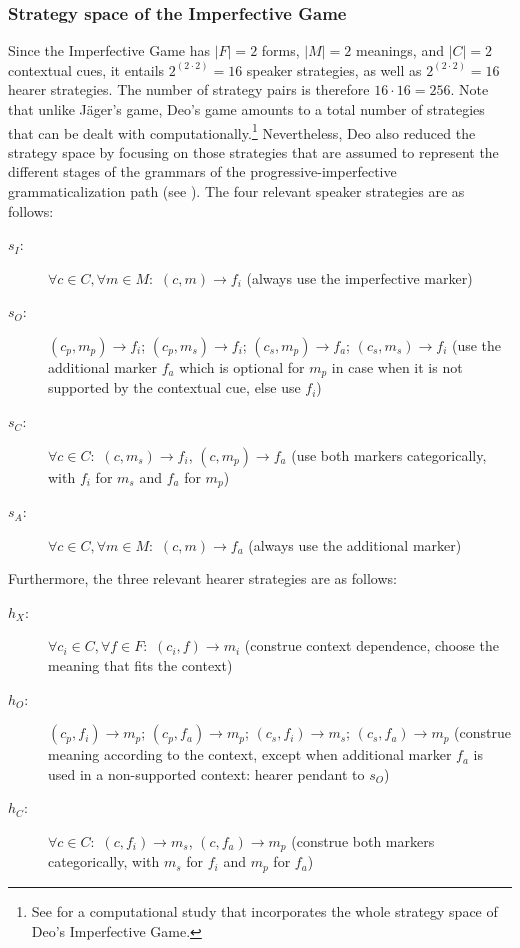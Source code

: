 \documentclass[output=paper,hidelinks]{langscibook}
\begin{document}
\subsubsection{Strategy space of the Imperfective Game}

Since the Imperfective Game has $|F|=2$ forms, $|M| = 2$ meanings, and $|C| = 2$ contextual cues, it entails $2^{(2 \cdot 2)}= 16$ speaker strategies, as well as $2^{(2 \cdot 2)}= 16$ hearer strategies.  The number of strategy pairs is therefore $16 \cdot 16 = 256$. Note that unlike Jäger's game, Deo's game amounts to a total number of strategies that can be dealt with computationally.\footnote{See \citet{muehlenberndEnke_2017} for a computational study that incorporates the whole strategy space of Deo's Imperfective Game.} Nevertheless, Deo also reduced the strategy space by focusing on those strategies that are assumed to represent the different stages of the grammars of the progressive-imperfective grammaticalization path (see ). The four relevant speaker strategies are as follows:

\begin{description}%
\item[$s_I$:] $\forall c \in C, \forall m \in M:$ $(c,m) \rightarrow f_{i}$ (always use the imperfective marker)
\item[$s_O$:] $(c_{p},m_{p}) \rightarrow f_{i}$; $(c_{p},m_{s}) \rightarrow f_{i}$; $(c_{s},m_{p}) \rightarrow f_{a}$; $(c_{s},m_{s}) \rightarrow f_{i}$ (use the additional marker $f_a$ which is optional for $m_p$ in case when it is not supported by the contextual cue, else use $f_i$) 
\item[$s_C$:] $\forall c \in C:$ $(c,m_{s}) \rightarrow f_{i}$, $(c,m_{p}) \rightarrow f_{a}$ (use both markers categorically, with $f_i$ for $m_s$ and $f_a$ for $m_p$)
\item[$s_A$:] $\forall c \in C, \forall m \in M:$ $(c,m) \rightarrow f_{a}$ (always use the additional marker)
\end{description}

\noindent Furthermore, the three relevant hearer strategies are as follows:

\begin{description}
\item[$h_{X}$:] $\forall c_i \in C, \forall f \in F:$ $(c_i,f) \rightarrow m_{i}$ (construe context dependence, choose the meaning that fits the context)
\item[$h_O$:] $(c_{p},f_{i}) \rightarrow m_{p}$; $(c_{p}, f_{a}) \rightarrow m_{p}$; $(c_{s}, f_{i}) \rightarrow m_{s}$; $(c_{s}, f_{a}) \rightarrow m_{p}$ (construe meaning according to the context, except when additional marker $f_a$ is used in a non-supported context: hearer pendant to $s_O$) 
\item[$h_C$:] $\forall c \in C:$ $(c, f_i) \rightarrow m_s$, $(c, f_a) \rightarrow m_p$ (construe both markers categorically, with $m_s$ for $f_i$ and $m_p$ for $f_a$)
\end{description}
\end{document}
